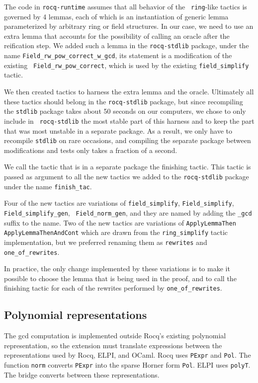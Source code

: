 \documentclass[11pt]{article}
\begin{document}
The code in {\tt rocq-runtime} assumes that all behavior of the {\tt
  ring}-like tactics is governed by 4 lemmas, each of which is an
instantiation of generic lemma parameterized by arbitrary ring or
field structures.  In our case, we need to use an extra lemma that
accounts for the possibility of calling an oracle after the
reification step.  We added such a lemma in the {\tt rocq-stdlib}
package, under the name {\tt Field\_rw\_pow\_correct\_w\_gcd}, its
statement is a modification of the existing {\tt
  Field\_rw\_pow\_correct}, which is used by the existing
{\tt field\_simplify} tactic.

We then created tactics to harness the extra lemma and the oracle.
Ultimately all these tactics should belong in the {\tt rocq-stdlib}
package, but since recompiling the {\tt stdlib} package takes about 50
seconds on our computers, we chose to only include in {\tt
  rocq-stdlib} the most stable part of this harness
and to keep the part that was most unstable in a separate package.  As
a result, we only have to recompile {\tt stdlib} on rare occasions,
and compiling the separate package between modifications and tests
only takes a fraction of a second.

We call the tactic that is in a separate package the finishing tactic.
This tactic is passed as argument to all the new tactics we added to
the {\tt rocq-stdlib} package under the name {\tt finish\_tac}.

Four of the new tactics are variations of {\tt field\_simplify},
{\tt Field\_simplify}, {\tt Field\_simplify\_gen}, {\tt
  Field\_norm\_gen}, and they are named by adding the {\tt \_gcd}
suffix to the name.  Two of the new tactics are variations of
{\tt ApplyLemmaThen} {\tt ApplyLemmaThenAndCont} which
are drawn from the {\tt ring\_simplify} tactic implementation, but we
preferred renaming them as {\tt rewrites} and {\tt one\_of\_rewrites}.

In practice, the only change implemented by these variations is to
make it possible to choose the lemma that is being used in the proof,
and to call the finishing tactic for each of the rewrites performed by
{\tt one\_of\_rewrites}.
\subsection{Polynomial representations}


The gcd computation is implemented outside Rocq's existing polynomial representation, so the extension must translate expressions between the representations used by Rocq, ELPI, and OCaml.
Rocq uses \texttt{PExpr} and \texttt{Pol}. The function \texttt{norm} converts
\texttt{PExpr} into the sparse Horner form \texttt{Pol}. ELPI uses
\texttt{polyT}. The bridge converts between these representations.
\end{document}
